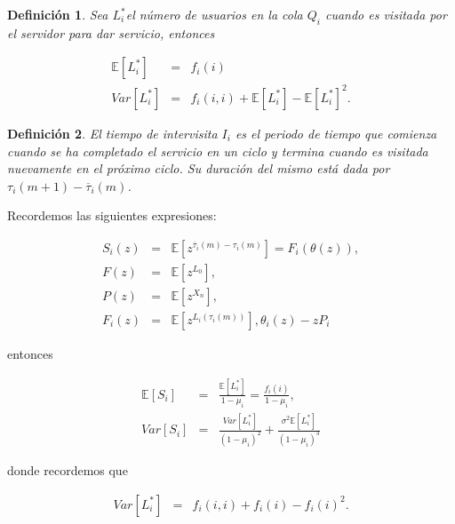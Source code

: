 \documentclass{article}
\newtheorem{Def}{Definición}[section]
\newcommand{\esp}{\mathbb{E}}
\numberwithin{equation}{section}
\begin{document}
\begin{Def}
Sea $L_{i}^{*}$el n\'umero de usuarios en la cola $Q_{i}$ cuando es visitada por el servidor para dar servicio, entonces

\begin{eqnarray}
\esp\left[L_{i}^{*}\right]&=&f_{i}\left(i\right)\\
Var\left[L_{i}^{*}\right]&=&f_{i}\left(i,i\right)+\esp\left[L_{i}^{*}\right]-\esp\left[L_{i}^{*}\right]^{2}.
\end{eqnarray}

\end{Def}


\begin{Def}
El tiempo de intervisita $I_{i}$ es el periodo de tiempo que comienza cuando se ha completado el servicio en un ciclo y termina cuando es visitada nuevamente en el pr\'oximo ciclo. Su  duraci\'on del mismo est\'a dada por $\tau_{i}\left(m+1\right)-\overline{\tau}_{i}\left(m\right)$.
\end{Def}


Recordemos las siguientes expresiones:

\begin{eqnarray*}
S_{i}\left(z\right)&=&\esp\left[z^{\overline{\tau}_{i}\left(m\right)-\tau_{i}\left(m\right)}\right]=F_{i}\left(\theta\left(z\right)\right),\\
F\left(z\right)&=&\esp\left[z^{L_{0}}\right],\\
P\left(z\right)&=&\esp\left[z^{X_{n}}\right],\\
F_{i}\left(z\right)&=&\esp\left[z^{L_{i}\left(\tau_{i}\left(m\right)\right)}\right],
\theta_{i}\left(z\right)-zP_{i}
\end{eqnarray*}

entonces 

\begin{eqnarray*}
\esp\left[S_{i}\right]&=&\frac{\esp\left[L_{i}^{*}\right]}{1-\mu_{i}}=\frac{f_{i}\left(i\right)}{1-\mu_{i}},\\
Var\left[S_{i}\right]&=&\frac{Var\left[L_{i}^{*}\right]}{\left(1-\mu_{i}\right)^{2}}+\frac{\sigma^{2}\esp\left[L_{i}^{*}\right]}{\left(1-\mu_{i}\right)^{3}}
\end{eqnarray*}

donde recordemos que

\begin{eqnarray*}
Var\left[L_{i}^{*}\right]&=&f_{i}\left(i,i\right)+f_{i}\left(i\right)-f_{i}\left(i\right)^{2}.
\end{eqnarray*}
\end{document}
